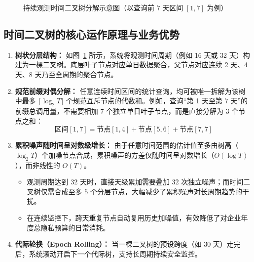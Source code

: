 \begin{figure}[htbp]
\caption{持续观测时间二叉树分解示意图（以查询前 7 天区间 $[1, 7]$ 为例）}
\label{fig:time_tree}
\end{figure}

\subsection{时间二叉树的核心运作原理与业务优势}
\begin{enumerate}[label=\textbf{\arabic*.}, leftmargin=2em]
  \item \textbf{树状分层结构：} 如图~\ref{fig:time_tree} 所示，系统将观测时间周期（例如 16 天或 32 天）构建为一棵二叉树。底层叶子节点对应单日数据聚合，父节点对应连续 2 天、4 天、8 天乃至全周期的聚合节点。
  \item \textbf{规范前缀对偶分解：} 任意连续时间区间的统计查询，均可被唯一拆解为该树中最多 $\lceil \log_2 T \rceil$ 个规范互斥节点的代数和。例如，查询“第 1 天至第 7 天”的前缀总调用量，不需要相加 7 个独立单日叶子节点，而是直接分解为 3 个节点之和：
  \begin{equation}
    \text{区间} [1, 7] = \text{节点}[1, 4] + \text{节点}[5, 6] + \text{节点}[7, 7]
  \end{equation}
  \item \textbf{累积噪声随时间呈对数级增长：}
  由于任意时间范围的估计值至多由树高（$\log_2 T$）个加噪节点合成，累积噪声的方差仅随时间呈对数增长（$O(\log T)$），而非线性的 $O(T)$。
  \begin{itemize}
    \item 观测周期达到 32 天时，直接天级累加需要叠加 32 次独立噪声；而时间二叉树仅需合成至多 5 个分层节点，大幅减少了累积噪声对长周期趋势的干扰。
    \item 在连续监控下，跨天重复节点自动复用历史加噪值，有效降低了对企业年度总隐私预算的日常消耗。
  \end{itemize}
  \item \textbf{代际轮换（Epoch Rolling）：} 当一棵二叉树的预设跨度（如 30 天）走完后，系统滚动开启下一个代际树，支持长周期持续安全监控。
\end{enumerate}
